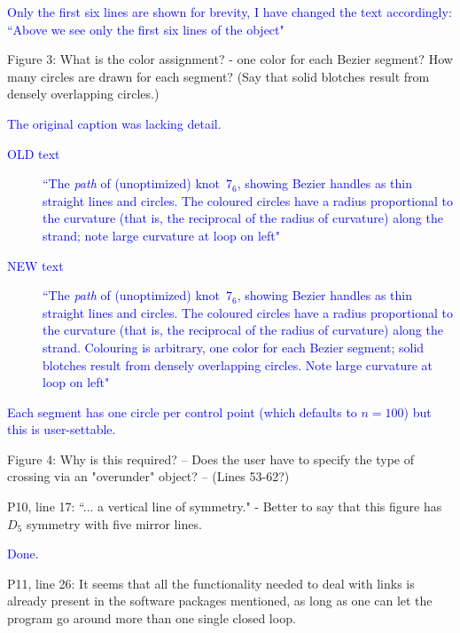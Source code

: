 \documentclass[12pt]{article}
\begin{document}
\textcolor{blue}{Only the first six lines are shown for brevity, I have
  changed the text accordingly: ``Above we see only the first six lines
of the object"}


Figure 3: What is the color assignment? - one color for each Bezier
segment?  How many circles are drawn for each segment?  (Say that
solid blotches result from densely overlapping circles.)

\textcolor{blue}{The original caption was lacking detail.
  \begin{description}
  \item[OLD text] ``The \emph{path} of (unoptimized) knot~$7_6$,
    showing Bezier handles as thin straight lines and circles.  The
    coloured circles have a radius proportional to the curvature (that
    is, the reciprocal of the radius of curvature) along the strand;
    note large curvature at loop on left"
  \item[NEW text] ``The \emph{path} of (unoptimized) knot~$7_6$,
    showing Bezier handles as thin straight lines and circles.  The
    coloured circles have a radius proportional to the curvature (that
    is, the reciprocal of the radius of curvature) along the strand.
    Colouring is arbitrary, one color for each Bezier segment; solid
    blotches result from densely overlapping circles.  Note large
    curvature at loop on left"
  \end{description}
  Each segment has one circle per control point (which defaults to
  $n=100$) but this is user-settable.
}



Figure 4: Why is this required?  -- Does the user have to specify the
type of crossing via an "overunder" object?  -- (Lines 53-62?)

P10, line 17: ``... a vertical line of symmetry." - Better to say that
this figure has $D_5$ symmetry with five mirror lines.


\textcolor{blue}{Done.}

P11, line 26: It seems that all the functionality needed to deal with
links is already present in the software packages mentioned, as long
as one can let the program go around more than one single closed loop.
\end{document}
